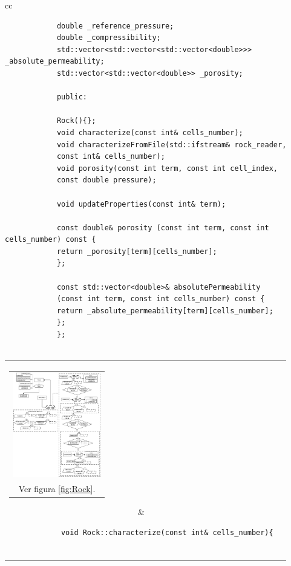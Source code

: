 \begin{appendix}
\begin{table}[h]
\begin{tabular}{cc}
\begin{tiny}
\begin{lstlisting}
			double _reference_pressure;
			double _compressibility;
			std::vector<std::vector<std::vector<double>>> _absolute_permeability;   
			std::vector<std::vector<double>> _porosity;
			
			public:
			
			Rock(){};
			void characterize(const int& cells_number);
			void characterizeFromFile(std::ifstream& rock_reader,
			const int& cells_number);
			void porosity(const int term, const int cell_index,
			const double pressure);
			
			void updateProperties(const int& term);
			
			const double& porosity (const int term, const int cells_number) const {
			return _porosity[term][cells_number];
			};
			
			const std::vector<double>& absolutePermeability
			(const int term, const int cells_number) const {
			return _absolute_permeability[term][cells_number];
			};
			};
			
			\end{lstlisting}
		\end{tiny}
	\end{tabular}
	\label{tab:RockCode}
	\caption[Traducción a código del concepto Roca.]{Traducción a código del concepto Roca. Los autores.}
\end{table}

\begin{table}[h]
	\centering
	\begin{tabular}{cc}
		\parbox[c]{5em}{
			\begin{tabular}[c]{@{}c@{}}\includegraphics[width=1.5in]{Fig/Rock.pdf}\\ Ver figura \ref{fig:Rock}.\end{tabular}
		}
		&
		\begin{tiny}
			\begin{lstlisting}
			void Rock::characterize(const int& cells_number){
			

\end{lstlisting}
\end{tiny}
\end{tabular}
\end{table}
\end{appendix}
